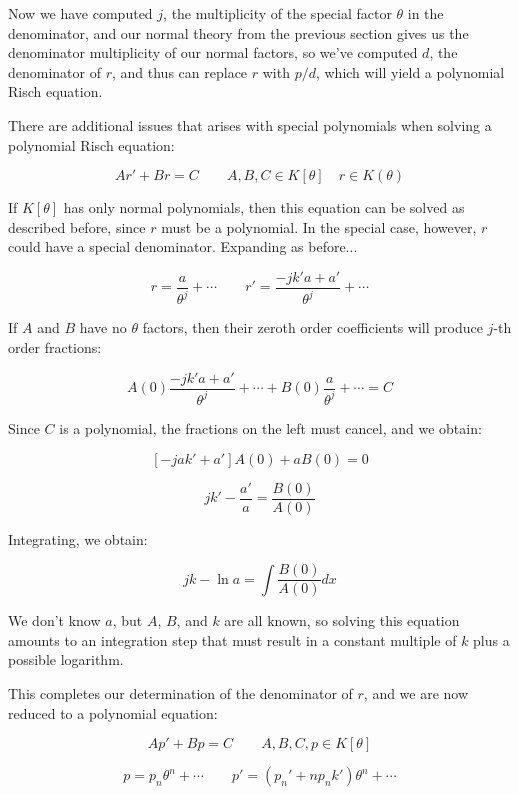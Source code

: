 Now we have computed $j$, the multiplicity of the special factor
$\theta$ in the
denominator, and our normal theory from the previous section gives us
the denominator multiplicity of our normal factors, so
we've computed $d$, the denominator of $r$, and
thus can replace $r$ with $p/d$, which will
yield a polynomial Risch equation.

There are additional issues that arises with special polynomials when
solving a polynomial Risch equation:

\begin{equation}
\label{eq: special polynomial Risch}
A r' + B r = C \qquad A,B,C \in K[\theta] \quad r \in K(\theta)
\end{equation}

If $K[\theta]$ has only normal polynomials, then this equation can be
solved as described before, since $r$ must be a polynomial.
In the special case, however, $r$ could have a special denominator.
Expanding as before...

$$r = \frac{a}{\theta^j} + \cdots  \qquad  r' = \frac{-j k' a + a'}{\theta^{j}} + \cdots$$

If $A$ and $B$ have no $\theta$ factors, then their zeroth order coefficients will produce $j$-th order fractions:

$$ A(0) \frac{-j k' a + a'}{\theta^{j}} + \cdots
+ B(0) \frac{a}{\theta^j} + \cdots  = C$$

Since $C$ is a polynomial, the fractions on the left must cancel, and we obtain:

$$\left[ -j a k' + a' \right] A(0) + a B(0) = 0$$


$$ jk' - \frac{a'}{a }  = \frac{B(0)}{A(0)}$$

Integrating, we obtain:

$$ jk - \ln a = \int \frac{B(0)}{A(0)} dx$$

We don't know $a$, but $A$, $B$, and $k$ are all known, so solving
this equation amounts to an integration step that must result in a
constant multiple of $k$ plus a possible logarithm.

This completes our determination of the denominator of $r$, and we
are now reduced to a polynomial equation:

$$A p' + B p = C \qquad A,B,C,p \in K[\theta]$$

$$p = p_n \theta^n + \cdots \qquad p' = (p_n' + n p_n k') \theta^n + \cdots$$

